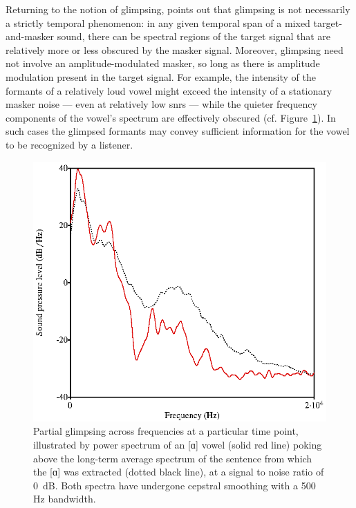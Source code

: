 Returning to the notion of glimpsing, \citet{Cooke2006} points out that glimpsing is not necessarily a strictly temporal phenomenon: in any given temporal span of a mixed target-and-masker sound, there can be spectral regions of the target signal that are relatively more or less obscured by the masker signal.  Moreover, glimpsing need not involve an amplitude-modulated masker, so long as there is amplitude modulation present in the target signal.  For example, the intensity of the formants of a relatively loud vowel might exceed the intensity of a stationary masker noise — even at relatively low \ac{snr}s — while the quieter frequency components of the vowel’s spectrum are effectively obscured (cf. Figure~\ref{fig:PartialGlimpsing}).  In such cases the glimpsed formants may convey sufficient information for the vowel to be recognized by a listener.  %

\begin{figure}[htbp]
	\begin{centering}
	\includegraphics{figures/partialGlimpsing.eps}
	\caption[Partial glimpsing across frequencies at a particular time point]{Partial glimpsing across frequencies at a particular time point, illustrated by power spectrum of an [ɑ] vowel (solid red line) poking above the long-term average spectrum of the sentence from which the [ɑ] was extracted (dotted black line), at a signal to noise ratio of 0~dB. Both spectra have undergone cepstral smoothing with a 500 Hz bandwidth.\label{fig:PartialGlimpsing}}
	\end{centering}
\end{figure}


